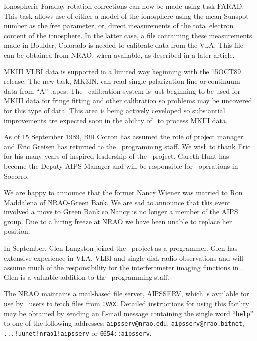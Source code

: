    Ionospheric Faraday rotation corrections can now be made using task
FARAD.  This task allows use of either a model of the ionosphere using
the mean Sunspot number as the free parameter, or, direct measurements of
the total electron content of the ionosphere.  In the latter case, a
file containing these measurements made in Boulder, Colorado is needed
to calibrate data from the \hbox{VLA}.  This file can be obtained from NRAO,
when available, as described in a later article.

   MKIII VLBI data is supported in a limited way beginning with the
15OCT89 release.  The new task, MK3IN, can read single polarization line
or continuum data from ``A'' tapes.  The \AIPS\ calibration system is
just beginning to be used for MKIII data for fringe fitting and other
calibration so problems may be uncovered for this type of data.  This
area is being actively developed so substantial improvements are
expected soon in the ability of \AIPS\  to process MKIII data.

\vfill\eject
{}

   As of 15 September 1989,  Bill Cotton has assumed the role
of project manager and Eric Greisen has returned to the \AIPS\
programming staff.  We wish to thank Eric for his many years of
inspired leadership of the \AIPS\  project.  Gareth Hunt has become
the Deputy AIPS Manager and will be responsible for \AIPS\ operations
in Socorro.

   We are happy to announce that the former Nancy Wiener was married
to Ron Maddalena of NRAO-Green Bank.   We are sad to announce that this
event involved a move to Green Bank so Nancy is no longer a
member of the AIPS group.  Due to a hiring freeze at NRAO we have been
unable to replace her position.

   In September, Glen Langston joined the \AIPS\  project as a programmer.
Glen has extensive experience in VLA, VLBI and single dish radio
observations and will assume much of the responsibility for the
interferometer imaging functions in \AIPS .  Glen is a valuable addition
to the \AIPS\  programming staff.


   The NRAO maintains a mail-based file server, AIPSSERV, which is
available for use by \AIPS\ users to fetch files from {\tt CVAX}.
Detailed instructions for using this facility may be obtained by
sending an E-mail message containing the single word ``{\tt help}'' to
one of the following addresses:\hfil\break
{\tt aipsserv@nrao.edu}, {\tt aipsserv@nrao.bitnet}, {\tt
...!uunet!nrao1!aipsserv} or {\tt 6654::aipsserv}.

